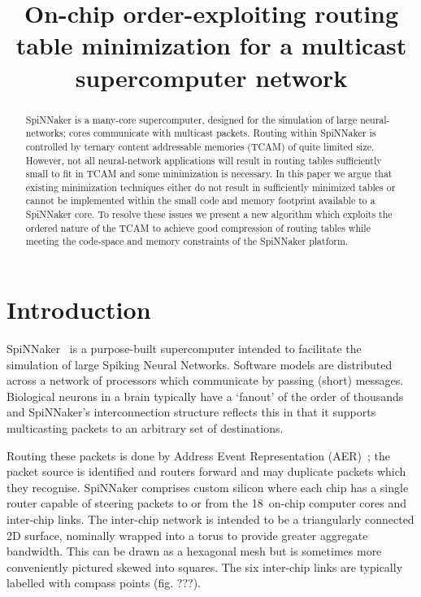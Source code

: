 \documentclass[conference]{IEEEtran}
\title{On-chip order-exploiting routing table minimization for a multicast supercomputer network}
\author{%
  \IEEEauthorblockN{Andrew~Mundy, Jonathan~Heathcote and Jim~D.~Garside}
  \IEEEauthorblockA{School of Computer Science,\\
                    University of Manchester, UK}
}
\begin{document}
  \maketitle

  \begin{abstract}
SpiNNaker is a many-core supercomputer, designed for the simulation of large neural-networks; cores communicate with multicast packets.
Routing within SpiNNaker is controlled by ternary content addressable memories (TCAM) of quite limited size.
However, not all neural-network applications will result in routing tables sufficiently small to fit in TCAM and some minimization is necessary.
In this paper we argue that existing minimization techniques either do not result in sufficiently minimized tables or cannot be implemented within the small code and memory footprint available to a SpiNNaker core.
To resolve these issues we present a new algorithm which exploits the ordered nature of the TCAM to achieve good compression of routing tables while meeting the code-space and memory constraints of the SpiNNaker platform.

  \end{abstract}

  \section{Introduction}

SpiNNaker~\parencite{Furber2014} is a purpose-built supercomputer intended to facilitate the simulation of large Spiking Neural Networks.
Software models are distributed across a network of processors which communicate by passing (short) messages.
Biological neurons in a brain typically have a `fanout' of the order of thousands and SpiNNaker's interconnection structure reflects this in that it supports multicasting packets to an arbitrary set of destinations.

Routing these packets is done by Address Event Representation (AER)~\parencite{Boahen2000}; the packet source is identified and routers forward and may duplicate packets which they recognise.
SpiNNaker comprises custom silicon where each chip has a single router capable of steering packets to or from the 18~on-chip computer cores and inter-chip links.
The inter-chip network is intended to be a triangularly connected 2D surface, nominally wrapped into a torus to provide greater aggregate bandwidth.
This can be drawn as a hexagonal mesh but is sometimes more conveniently pictured skewed into squares.
The six inter-chip links are typically labelled with compass points (fig. ???).
\end{document}
